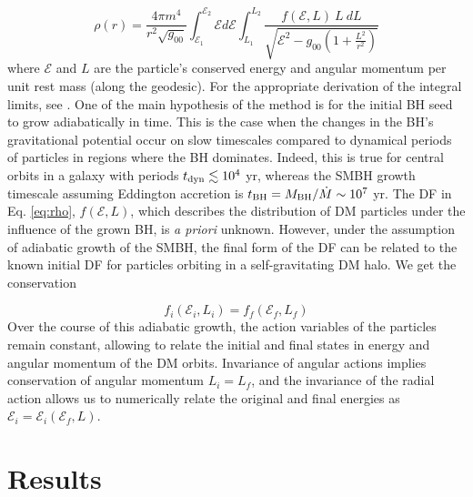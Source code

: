 \documentclass[baaa]{baaa}
\begin{document}
\begin{equation} \label{eq:rho}     
    \rho(r) = \frac{4\pi m^4}{r^2 \sqrt{g_{00}}} \int_{\mathcal{E}_{1}}^{\mathcal{E}_{2}} \mathcal{E} d\mathcal{E} \int_{L_{1}}^{L_{2}}\frac{f(\mathcal{E},L)\ L\ dL}{\sqrt{\mathcal{E}^2 - g_{00}(1+\frac{L^2}{r^2})}}
\end{equation}
%
where $\mathcal{E}$ and $L$ are the particle's conserved energy and angular momentum per unit rest mass (along the geodesic). 
For the appropriate derivation of the integral limits, see \cite{sadeghian2013dark}.
One of the main hypothesis of the method is for the initial BH seed to grow adiabatically in time. This is the case when the changes in the BH's gravitational potential occur on slow timescales compared to dynamical periods of particles in regions where the BH dominates. 
Indeed, this is true for central orbits in a galaxy with periods $t_{{\rm dyn}} \lesssim 10^4$ yr, whereas the SMBH growth timescale assuming Eddington accretion is $t_{{\rm BH}}=M_{\rm BH}/\dot{M} \sim 10^7$ yr.
The DF  in Eq. \ref{eq:rho}, $f(\mathcal{E},L)$, which describes the distribution of DM particles under the influence of the grown BH, is \textit{a priori} unknown. However, under the assumption of adiabatic growth of the SMBH, the final form of the DF can be related to the known initial DF for particles orbiting in a self-gravitating DM halo. We get the conservation

\begin{equation}
    f_i(\mathcal{E}_i,L_i)=f_f(\mathcal{E}_f,L_f)
\end{equation} 
%
Over the course of this adiabatic growth, the action variables of the particles remain constant, allowing to relate the initial and final states in energy and angular momentum of the DM orbits. Invariance of angular actions implies conservation of angular momentum $L_i = L_f$, and the invariance of the radial action allows us to numerically relate the original and final energies as $\mathcal{E}_i = \mathcal{E}_i(\mathcal{E}_f,L)$. 

\section{Results}\label{sec:results}
\end{document}
